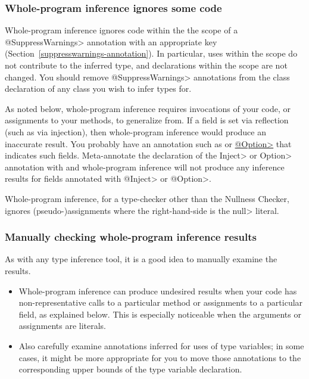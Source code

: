 \subsubsection{Whole-program inference ignores some code\label{whole-program-inference-ignores-some-code}}

Whole-program inference ignores code within the the scope of a
\<@SuppressWarnings> annotation with an appropriate key
(Section~\ref{suppresswarnings-annotation}).  In particular, uses within
the scope do not contribute to the inferred type, and declarations within
the scope are not changed.  You should remove \<@SuppressWarnings> annotations
from the class declaration of any class you wish to infer types for.

As noted below, whole-program inference requires invocations of your code, or
assignments to your methods, to generalize from.  If a field is set via
reflection (such as via injection), then whole-program inference would produce
an inaccurate result.  You probably have an annotation such as
or
\href{http://types.cs.washington.edu/plume-lib/api/plume/Option.html}{\<@Option>}
that indicates such fields.  Meta-annotate the declaration of the \<Inject>
or \<Option> annotation with
 and whole-program
inference will not produce any inference results for fields annotated with
\<@Inject> or \<@Option>.

Whole-program inference, for a type-checker other than the Nullness Checker,
ignores (pseudo-)assignments where the right-hand-side is the \<null> literal.

\subsubsection{Manually checking whole-program inference results\label{whole-program-inference-manual-checking}}

As with any type inference tool, it is a good idea to manually examine the
results.

\begin{itemize}
\item
Whole-program inference can produce undesired results when your code has
non-representative calls to a particular method or assignments to a
particular field, as explained below.
This is especially noticeable when the arguments or assignments are literals.

\item
Also carefully examine annotations inferred for uses of type variables; in
some cases, it might be more appropriate for you to move those annotations
to the corresponding upper bounds of the type variable declaration.

\end{itemize}


